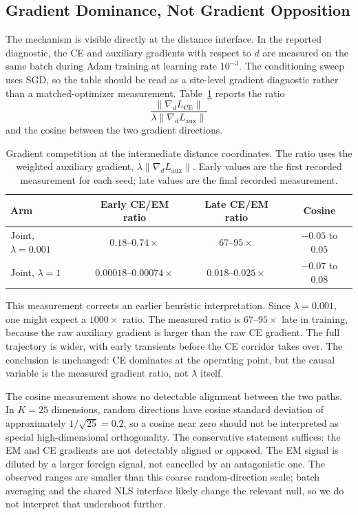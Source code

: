 \subsection{Gradient Dominance, Not Gradient Opposition}
The mechanism is visible directly at the distance interface. In the reported
diagnostic, the CE and auxiliary gradients with respect to $d$ are measured on
the same batch during Adam training at learning rate $10^{-3}$. The
conditioning sweep uses SGD, so the table should be read as a site-level
gradient diagnostic rather than a matched-optimizer measurement.
Table~\ref{tab:gradient-competition} reports the ratio
\[
    \frac{\|\nabla_d L_{\mathrm{CE}}\|}
         {\lambda\|\nabla_d L_{\mathrm{aux}}\|}
\]
and the cosine between the two gradient directions.
\begin{table}[h]
\centering
\begin{tabular}{lccc}
\toprule
Arm & Early CE/EM ratio & Late CE/EM ratio & Cosine \\
\midrule
Joint, $\lambda=0.001$ & $0.18$--$0.74\times$ & $67$--$95\times$ &
$-0.05$ to $0.05$ \\
Joint, $\lambda=1$ & $0.00018$--$0.00074\times$ & $0.018$--$0.025\times$ &
$-0.07$ to $0.08$ \\
\bottomrule
\end{tabular}
\caption{Gradient competition at the intermediate distance coordinates. The
ratio uses the weighted auxiliary gradient,
$\lambda\|\nabla_d L_{\mathrm{aux}}\|$. Early values are the first recorded
measurement for each seed; late values are the final recorded measurement.}
\label{tab:gradient-competition}
\end{table}
This measurement corrects an earlier heuristic interpretation. Since
$\lambda=0.001$, one might expect a $1000\times$ ratio. The measured ratio is
$67$--$95\times$ late in training, because the raw auxiliary gradient is
larger than the raw CE gradient. The full trajectory is wider, with early
transients before the CE corridor takes over. The conclusion is unchanged: CE
dominates at the operating point, but the causal variable is the measured
gradient ratio, not $\lambda$ itself.

The cosine measurement shows no detectable alignment between the two paths. In
$K=25$ dimensions, random directions have cosine standard deviation of
approximately $1/\sqrt{25}=0.2$, so a cosine near zero should not be
interpreted as special high-dimensional orthogonality. The conservative
statement suffices: the EM and CE gradients are not detectably aligned or
opposed. The EM signal is diluted by a larger foreign signal, not cancelled by
an antagonistic one. The observed ranges are smaller than this coarse
random-direction scale; batch averaging and the shared NLS interface likely
change the relevant null, so we do not interpret that undershoot further.

